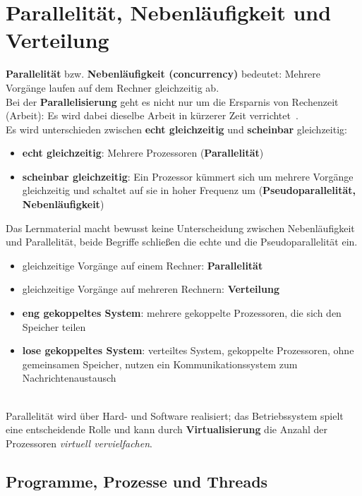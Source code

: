 \chapter{Parallelität, Nebenläufigkeit und Verteilung}


\textbf{Parallelität} bzw. \textbf{Nebenläufigkeit (concurrency)} bedeutet: Mehrere Vorgänge laufen auf dem Rechner gleichzeitig ab.\\

Bei der \textbf{Parallelisierung} geht es nicht nur um die Ersparnis von Rechenzeit (Arbeit): Es wird dabei dieselbe Arbeit in kürzerer Zeit verrichtet~\cite[40]{Oec22}.\\

Es wird unterschieden zwischen \textbf{echt gleichzeitig} und \textbf{scheinbar} gleichzeitig:
\begin{itemize}
    \item \textbf{echt gleichzeitig}: Mehrere Prozessoren (\textbf{Parallelität})
    \item \textbf{scheinbar gleichzeitig}: Ein Prozessor kümmert sich um mehrere Vorgänge gleichzeitig und schaltet auf sie in hoher Frequenz um (\textbf{Pseudoparallelität, Nebenläufigkeit})
\end{itemize}

Das Lernmaterial macht bewusst keine Unterscheidung zwischen Nebenläufigkeit und Parallelität, beide Begriffe schließen die echte und die Pseudoparallelität ein.

\begin{itemize}[label=$\rightarrow$]
    \item gleichzeitige Vorgänge auf einem Rechner: \textbf{Parallelität}
    \item gleichzeitige Vorgänge auf mehreren Rechnern: \textbf{Verteilung}
    \item \textbf{eng gekoppeltes System}: mehrere gekoppelte Prozessoren, die sich den Speicher teilen
    \item \textbf{lose gekoppeltes System}: verteiltes System, gekoppelte Prozessoren, ohne gemeinsamen Speicher, nutzen ein Kommunikationssystem zum Nachrichtenaustausch
\end{itemize}\\

Parallelität wird über Hard- und Software realisiert; das Betriebssystem spielt eine entscheidende Rolle und kann durch \textbf{Virtualisierung} die Anzahl der Prozessoren \textit{virtuell vervielfachen}.

\section{Programme, Prozesse und Threads}

